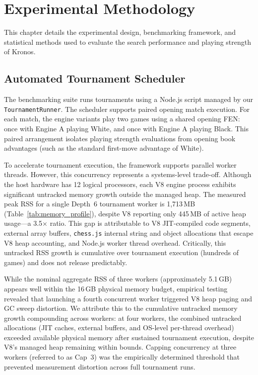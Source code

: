 \chapter{Experimental Methodology}
\label{ch:experimental_methodology}

This chapter details the experimental design, benchmarking framework, and statistical methods used to evaluate the search performance and playing strength of Kronos.

\section{Automated Tournament Scheduler}
The benchmarking suite runs tournaments using a Node.js script managed by our \texttt{TournamentRunner}. The scheduler supports paired opening match execution. For each match, the engine variants play two games using a shared opening FEN: once with Engine A playing White, and once with Engine A playing Black. This paired arrangement isolates playing strength evaluations from opening book advantages (such as the standard first-move advantage of White). 

To accelerate tournament execution, the framework supports parallel worker threads. However, this concurrency represents a systems-level trade-off. Although the host hardware has 12 logical processors, each V8 engine process exhibits significant untracked memory growth outside the managed heap. The measured peak RSS for a single Depth~6 tournament worker is 1,713\,MB (Table~\ref{tab:memory_profile}), despite V8 reporting only 445\,MB of active heap usage---a 3.5$\times$ ratio. This gap is attributable to V8 JIT-compiled code segments, external array buffers, \texttt{chess.js} internal string and object allocations that escape V8 heap accounting, and Node.js worker thread overhead. Critically, this untracked RSS growth is cumulative over tournament execution (hundreds of games) and does not release predictably.

While the nominal aggregate RSS of three workers (approximately 5.1\,GB) appears well within the 16\,GB physical memory budget, empirical testing revealed that launching a fourth concurrent worker triggered V8 heap paging and GC sweep distortion. We attribute this to the cumulative untracked memory growth compounding across workers: at four workers, the combined untracked allocations (JIT caches, external buffers, and OS-level per-thread overhead) exceeded available physical memory after sustained tournament execution, despite V8's managed heap remaining within bounds. Capping concurrency at three workers (referred to as Cap~3) was the empirically determined threshold that prevented measurement distortion across full tournament runs.



